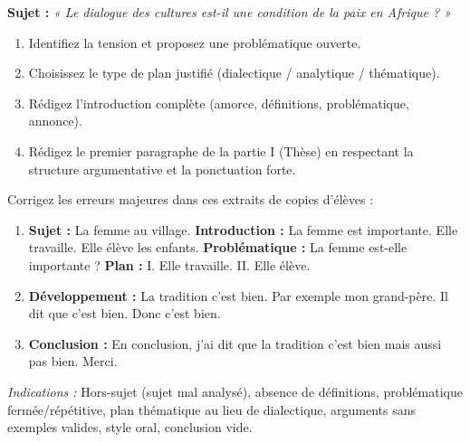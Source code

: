 \documentclass[11pt]{article}
\begin{document}
\begin{exercice}
\textbf{Sujet :} \emph{« Le dialogue des cultures est-il une condition de la paix en Afrique ? »}
\begin{enumerate}
\item Identifiez la tension et proposez une problématique ouverte.
\item Choisissez le type de plan justifié (dialectique / analytique / thématique).
\item Rédigez l'introduction complète (amorce, définitions, problématique, annonce).
\item Rédigez le premier paragraphe de la partie I (Thèse) en respectant la structure argumentative et la ponctuation forte.
\end{enumerate}
\end{exercice}

\begin{exercice}
Corrigez les erreurs majeures dans ces extraits de copies d'élèves :
\begin{enumerate}
\item \og \textbf{Sujet :} La femme au village. \textbf{Introduction :} La femme est importante. Elle travaille. Elle élève les enfants. \textbf{Problématique :} La femme est-elle importante ? \textbf{Plan :} I. Elle travaille. II. Elle élève. \fg
\item \og \textbf{Développement :} La tradition c'est bien. Par exemple mon grand-père. Il dit que c'est bien. Donc c'est bien. \fg
\item \og \textbf{Conclusion :} En conclusion, j'ai dit que la tradition c'est bien mais aussi pas bien. Merci. \fg
\end{enumerate}
\textit{Indications :} Hors-sujet (sujet mal analysé), absence de définitions, problématique fermée/répétitive, plan thématique au lieu de dialectique, arguments sans exemples valides, style oral, conclusion vide.
\end{exercice}
\end{document}
